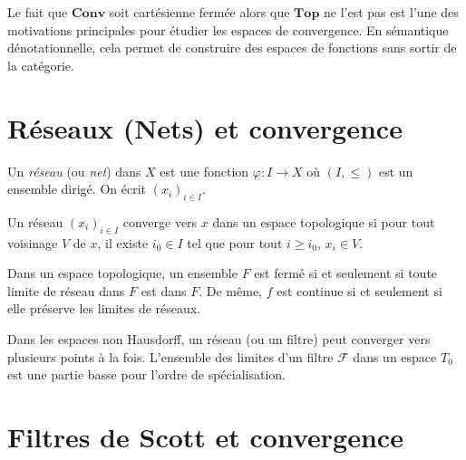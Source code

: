 \begin{remarque}
Le fait que $\mathbf{Conv}$ soit cart\'esienne ferm\'ee alors que $\mathbf{Top}$ ne l'est
pas est l'une des motivations principales pour \'etudier les espaces de convergence. En
s\'emantique d\'enotationnelle, cela permet de construire des espaces de fonctions sans
sortir de la cat\'egorie.
\end{remarque}

\section{R\'eseaux (Nets) et convergence}

\begin{definition}[R\'eseau]
Un \emph{r\'eseau} (ou \emph{net}) dans $X$ est une fonction $\varphi\colon I \to X$ o\`u
$(I, \leq)$ est un ensemble dirig\'e. On \'ecrit $(x_i)_{i\in I}$.
\end{definition}

\begin{definition}
Un r\'eseau $(x_i)_{i\in I}$ converge vers $x$ dans un espace topologique si pour tout
voisinage $V$ de $x$, il existe $i_0 \in I$ tel que pour tout $i \geq i_0$, $x_i \in V$.
\end{definition}

\begin{theoreme}
Dans un espace topologique, un ensemble $F$ est ferm\'e si et seulement si toute limite
de r\'eseau dans $F$ est dans $F$. De m\^eme, $f$ est continue si et seulement si elle
pr\'eserve les limites de r\'eseaux.
\end{theoreme}

\begin{attention}
Dans les espaces non Hausdorff, un r\'eseau (ou un filtre) peut converger vers plusieurs
points \`a la fois. L'ensemble des limites d'un filtre $\mathcal{F}$ dans un espace $T_0$
est une partie basse pour l'ordre de sp\'ecialisation.
\end{attention}

\section{Filtres de Scott et convergence}

